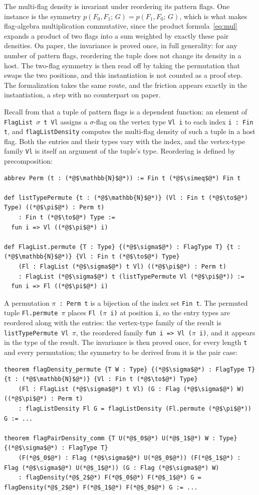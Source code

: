 \documentclass{article}
\newcommand{\den}[2]{p(#1;\,#2)}
\newcommand{\lean}[1]{\texttt{#1}}
\begin{document}
The multi-flag density is invariant under reordering its pattern flags.  One
instance is the symmetry
\(
  \den{F_0,F_1}{G}=\den{F_1,F_0}{G}
\),
which is what makes flag-algebra multiplication commutative, since the
product formula~\eqref{eq:mul} expands a product of two flags into a sum
weighted by exactly these pair densities.  On paper, the invariance is proved
once, in full generality: for any number of pattern flags, reordering the
tuple does not change its density in a host.  The two-flag symmetry is then
read off by taking the permutation that swaps the two positions, and this
instantiation is not counted as a proof step.  The formalization takes the
same route, and the friction appears exactly in the instantiation, a step
with no counterpart on paper.

Recall from  that a tuple of pattern
flags is a dependent function: an element of
\lean{FlagList}~$\sigma$~\lean{t Vl} assigns 
a $\sigma$-flag on the vertex type \lean{Vl i} to each index \lean{i : Fin t}, and \lean{flagListDensity}
computes the multi-flag density of such a tuple in a host flag.  Both the
entries and their types vary with the index, and the vertex-type family
\lean{Vl} is itself an argument of the tuple's type.  Reordering is defined
by precomposition:
\begin{lstlisting}
abbrev Perm (t : (*@$\mathbb{N}$@*)) := Fin t (*@$\simeq$@*) Fin t

def listTypePermute {t : (*@$\mathbb{N}$@*)} (Vl : Fin t (*@$\to$@*) Type) ((*@$\pi$@*) : Perm t)
    : Fin t (*@$\to$@*) Type :=
  fun i => Vl ((*@$\pi$@*) i)

def FlagList.permute {T : Type} {(*@$\sigma$@*) : FlagType T} {t : (*@$\mathbb{N}$@*)} {Vl : Fin t (*@$\to$@*) Type}
    (Fl : FlagList (*@$\sigma$@*) t Vl) ((*@$\pi$@*) : Perm t)
    : FlagList (*@$\sigma$@*) t (listTypePermute Vl (*@$\pi$@*)) :=
  fun i => Fl ((*@$\pi$@*) i)
\end{lstlisting}
A permutation \lean{$\pi$ : Perm t} is a bijection of the index set
\lean{Fin t}.  The permuted tuple \lean{Fl.permute $\pi$} places
\lean{Fl ($\pi$ i)} at position \lean{i}, so the entry types are reordered
along with the entries: the vertex-type family of the result is
\lean{listTypePermute Vl $\pi$}, the reordered family
\lean{fun i => Vl ($\pi$ i)}, and it appears in the type of the result.  The
invariance is then proved once, for every length \lean{t} and every
permutation; the symmetry to be derived from it is the pair case:
\begin{lstlisting}
theorem flagDensity_permute {T W : Type} {(*@$\sigma$@*) : FlagType T} {t : (*@$\mathbb{N}$@*)} {Vl : Fin t (*@$\to$@*) Type}
    (Fl : FlagList (*@$\sigma$@*) t Vl) (G : Flag (*@$\sigma$@*) W) ((*@$\pi$@*) : Perm t)
    : flagListDensity Fl G = flagListDensity (Fl.permute (*@$\pi$@*)) G := ...

theorem flagPairDensity_comm {T U(*@$_0$@*) U(*@$_1$@*) W : Type} {(*@$\sigma$@*) : FlagType T} 
    (F(*@$_0$@*) : Flag (*@$\sigma$@*) U(*@$_0$@*)) (F(*@$_1$@*) : Flag (*@$\sigma$@*) U(*@$_1$@*)) (G : Flag (*@$\sigma$@*) W)
    : flagDensity(*@$_2$@*) F(*@$_0$@*) F(*@$_1$@*) G = flagDensity(*@$_2$@*) F(*@$_1$@*) F(*@$_0$@*) G := ...
\end{lstlisting}
\end{document}
